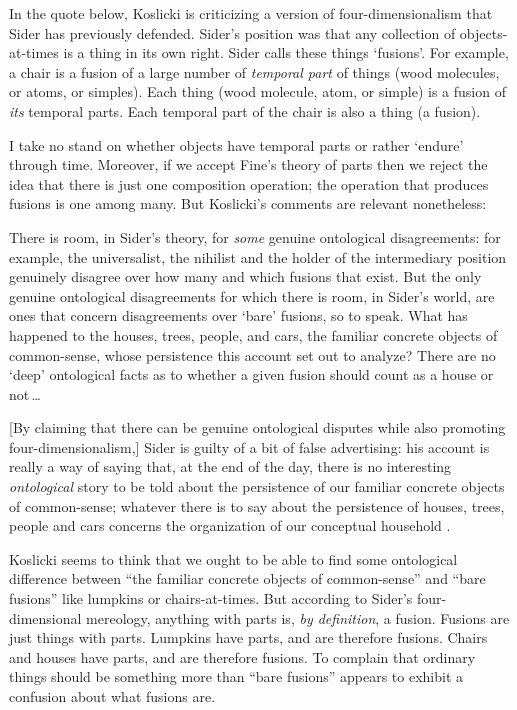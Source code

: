 \documentclass[11pt]{article}
\newenvironment{squote}{%
\begin{spacing}{1}
\begin{list}{}{%
\setlength{\labelwidth}{0pt}%
\rightmargin\leftmargin%
}
\item\relax
}{%
\end{list}%
\end{spacing}
}
\begin{document}
\begin{spacing}{1.5}
In the quote below, Koslicki is criticizing a version of
four-dimensionalism that Sider has previously defended.  Sider's
position was that any collection of objects-at-times is a thing in its
own right.  Sider calls these things `fusions'.  For example, a chair
is a fusion of a large number of {\em temporal part} of things (wood
molecules, or atoms, or simples).  Each thing (wood molecule, atom, or
simple) is a fusion of {\em its} temporal parts.  Each temporal part
of the chair is also a thing (a fusion).

I take no stand on whether objects have temporal parts or rather
`endure' through time.  Moreover, if we accept Fine's theory of parts
then we reject the idea that there is just one composition operation;
the operation that produces fusions is one among many.  But Koslicki's
comments are relevant nonetheless:

\begin{squote}
There is room, in Sider's theory, for {\em some} genuine ontological
disagreements: for example, the universalist, the nihilist and the
holder of the intermediary position genuinely disagree over how many
and which fusions that exist.  But the only genuine ontological
disagreements for which there is room, in Sider's world, are ones that
concern disagreements over `bare' fusions, so to speak.  What has
happened to the houses, trees, people, and cars, the familiar concrete
objects of common-sense, whose persistence this account set out to
analyze?  There are no `deep' ontological facts as to whether a given
fusion should count as a house or not\,\ldots

[By claiming that there can be genuine ontological disputes while also
  promoting four-dimensionalism,] Sider is guilty of a bit of false
advertising: his account is really a way of saying that, at the end of
the day, there is no interesting {\em ontological} story to be told
about the persistence of our familiar concrete objects of
common-sense; whatever there is to say about the persistence of
houses, trees, people and cars concerns the organization of our
conceptual household \citeyearpar[124--125]{koslicki2003}.
\end{squote}

Koslicki seems to think that we ought to be able to find some
ontological difference between ``the familiar concrete objects of
common-sense'' and ``bare fusions'' like lumpkins or chairs-at-times.
But according to Sider's four-dimensional mereology, anything with
parts is, {\em by definition}, a fusion.  Fusions are just things with
parts.  Lumpkins have parts, and are therefore fusions.  Chairs and
houses have parts, and are therefore fusions.  To complain that
ordinary things should be something more than ``bare fusions'' appears
to exhibit a confusion about what fusions are.


\end{spacing}
\end{document}
